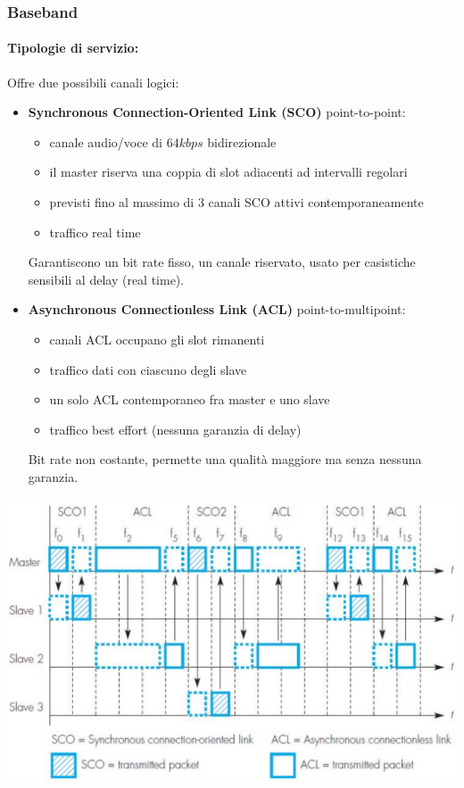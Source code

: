 
\subsubsection{Baseband}

\paragraph{Tipologie di servizio:} Offre due possibili canali logici: 
\begin{itemize}
	\item \textbf{Synchronous Connection-Oriented Link (SCO)} point-to-point:
	\begin{itemize}
		\item canale audio/voce di $64kbps$ bidirezionale
		\item il master riserva una coppia di slot adiacenti ad intervalli regolari
		\item previsti fino al massimo di 3 canali SCO attivi contemporaneamente
		\item traffico real time
	\end{itemize}
	Garantiscono un bit rate fisso, un canale riservato, usato per casistiche sensibili al delay (real time).
	
	\item \textbf{Asynchronous Connectionless Link (ACL)} point-to-multipoint:
	\begin{itemize}
		\item canali ACL occupano gli slot rimanenti
		\item traffico dati con ciascuno degli slave
		\item un solo ACL contemporaneo fra master e uno slave
		\item traffico best effort (nessuna garanzia di delay)
	\end{itemize}
	Bit rate non costante, permette una qualità maggiore ma senza nessuna garanzia.
\end{itemize}
\begin{center}
	\includegraphics[width=0.9\linewidth]{img/wpan/scoacl}
\end{center}

